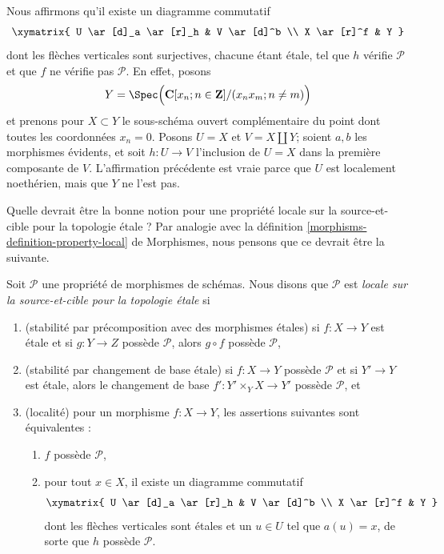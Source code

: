 \begin{example}
\medskip\noindent
Nous affirmons qu'il existe un diagramme commutatif
$$
\xymatrix{
U \ar[d]_a \ar[r]_h & V \ar[d]^b \\
X \ar[r]^f & Y
}
$$
dont les flèches verticales sont surjectives, chacune étant \'etale, tel que $h$ vérifie
$\mathcal{P}$ et que $f$ ne vérifie pas $\mathcal{P}$. En effet, posons
$$
Y =
\Spec\Big(
\mathbf{C}[x_n; n \in \mathbf{Z}]/(x_n x_m; n \not = m)
\Big)
$$
et prenons pour $X \subset Y$ le sous-schéma ouvert complémentaire du point
dont toutes les coordonnées $x_n = 0$. Posons $U = X$ et
$V = X \amalg Y$; soient $a, b$ les morphismes évidents, et soit
$h : U \to V$ l'inclusion de $U = X$ dans la première composante de $V$.
L'affirmation précédente est vraie parce que $U$ est localement noethérien,
mais que $Y$ ne l'est pas.
\end{example}

\noindent
Quelle devrait être la bonne notion pour une propriété locale sur la source-et-cible pour la topologie \'etale ? Par analogie avec la
définition \ref{morphisms-definition-property-local} de Morphismes, nous pensons
que ce devrait être la suivante.

\begin{definition}
\label{definition-local-source-target}
Soit $\mathcal{P}$ une propriété de morphismes de schémas.
Nous disons que $\mathcal{P}$ est {\it locale sur la source-et-cible pour
la topologie \'etale} si
\begin{enumerate}
\item (stabilité par précomposition avec des morphismes étales)
si $f : X \to Y$ est \'etale et si $g : Y \to Z$ possède $\mathcal{P}$,
alors $g \circ f$ possède $\mathcal{P}$,
\item (stabilité par changement de base \'etale)
si $f : X \to Y$ possède $\mathcal{P}$ et si $Y' \to Y$ est \'etale, alors
le changement de base $f' : Y' \times_Y X \to Y'$ possède $\mathcal{P}$, et
\item (localité) pour un morphisme $f : X \to Y$, les assertions suivantes
sont équivalentes :
\begin{enumerate}
\item $f$ possède $\mathcal{P}$,
\item pour tout $x \in X$, il existe un diagramme commutatif
$$
\xymatrix{
U \ar[d]_a \ar[r]_h & V \ar[d]^b \\
X \ar[r]^f & Y
}
$$
dont les flèches verticales sont étales et un $u \in U$ tel que
$a(u) = x$, de sorte que $h$ possède $\mathcal{P}$.
\end{enumerate}
\end{enumerate}
\end{definition}

